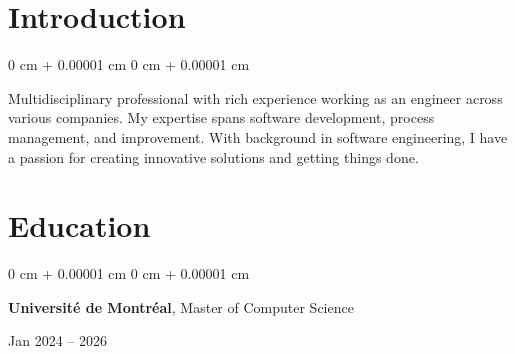 \documentclass[10pt, letterpaper]{article}
\newenvironment{highlights}{
    \begin{itemize}[
        topsep=0.10 cm,
        parsep=0.10 cm,
        partopsep=0pt,
        itemsep=0pt,
        leftmargin=0 cm + 10pt
    ]
}{
    \end{itemize}
} %
\newenvironment{highlightsforbulletentries}{
    \begin{itemize}[
        topsep=0.10 cm,
        parsep=0.10 cm,
        partopsep=0pt,
        itemsep=0pt,
        leftmargin=10pt
    ]
}{
    \end{itemize}
} %
\newenvironment{onecolentry}{
    \begin{adjustwidth}{
        0 cm + 0.00001 cm
    }{
        0 cm + 0.00001 cm
    }
}{
    \end{adjustwidth}
} %
\newenvironment{twocolentry}[2][]{
    \onecolentry
    \def\secondColumn{#2}
    \setcolumnwidth{\fill, 6.5 cm}
    \begin{paracol}{2}
}{
    \switchcolumn \raggedleft \secondColumn
    \end{paracol}
    \endonecolentry
} %
\begin{document}







    \section{Introduction}
        \begin{onecolentry}
            Multidisciplinary professional with rich experience working as an engineer across various companies. My expertise spans software development, process management, and improvement. With background in software engineering, I have a passion for creating innovative solutions and getting things done.
        \end{onecolentry}


    \section{Education} 
        \begin{twocolentry}{
            Jan 2024 – 2026
        }
            \textbf{Université de Montréal}, Master of Computer Science
        \end{twocolentry}

\end{document}

